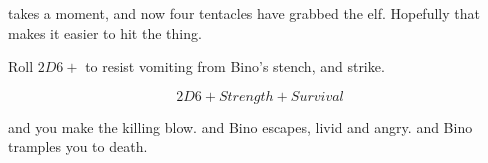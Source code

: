 takes a moment, and now four tentacles have grabbed the elf.
Hopefully that makes it easier to hit the thing.

Roll $2D6 + $  to resist vomiting from Bino's stench, and strike.

$$2D6 + Strength + Survival$$

\begin{selectPath}
  {and you make the killing blow.}%
  {}
  {and Bino escapes, livid and angry.}%
  {}
  {and Bino tramples you to death.}%
  {}
\end{selectPath}

\cyoaEnd
